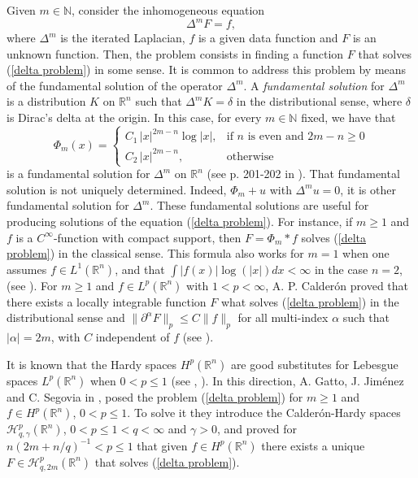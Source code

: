 \documentclass[reqno,10pt]{article}
\theoremstyle{definition}
\numberwithin{equation}{section}
\numberwithin{theorem}{section}
\begin{document}
Given $m \in \mathbb{N}$, consider the inhomogeneous equation
\begin{equation} \label{delta problem}
\Delta^m F = f,
\end{equation}
where $\Delta^m$ is the iterated Laplacian, $f$ is a given data function and $F$ is an unknown function. Then, the problem consists in 
finding a function $F$ that solves (\ref{delta problem}) in some sense. It is common to address this problem by means of the fundamental solution of the operator $\Delta^m$. A \textit{fundamental solution} for $\Delta^m$ is a distribution $K$ on $\mathbb{R}^n$ such that 
$\Delta^m K = \delta$ in the distributional sense, where $\delta$ is Dirac's delta at the origin. In this case, for every $m \in \mathbb{N}$ fixed, we have that 
\[
\Phi_m(x) = \left\{ \begin{array}{cc}
                 C_1 \, |x|^{2m-n} \log{|x|}, & \text{if} \,\, n \,\, \text{is even and} \,\, 2m-n \geq 0  \\
                 C_2 \, |x|^{2m-n}, & \text{otherwise}
               \end{array} \right.
\]
is a fundamental solution for $\Delta^m$ on $\mathbb{R}^n$ (see p. 201-202 in \cite{Gelfand}). That fundamental solution is not uniquely determined. Indeed, $\Phi_m + u$ with $\Delta^m u = 0$, it is other fundamental solution for $\Delta^m$. These fundamental solutions are useful for producing solutions of the equation (\ref{delta problem}). For instance, if $m \geq 1$ and $f$ is a $C^{\infty}$-function with compact support, then $F= \Phi_m \ast f$ solves (\ref{delta problem}) in the classical sense. This formula also works for $m = 1$ when one assumes $f \in L^1(\mathbb{R}^n)$, and that $\int |f(x)| \log(|x|) dx < \infty$ in the case $n=2$, (see \cite[Theorem 2.21]{Gerald}). For $m \geq 1$ and $f \in L^p(\mathbb{R}^n)$ with $1 < p < \infty$, A. P. Calder\'on proved that there exists a locally integrable function $F$ what solves (\ref{delta problem}) in the distributional sense and $\| \partial^{\alpha} F \|_p \leq C \|f\|_p$ for all multi-index $\alpha$ such that $|\alpha| = 2m$, with $C$ independent of $f$ (see \cite[Lemma 8]{calderon}). 

It is known that the Hardy spaces $H^p(\mathbb{R}^n)$ are good substitutes for Lebesgue spaces 
$L^p(\mathbb{R}^n)$ when $0 < p \leq 1$ (see \cite{fefferman}, \cite{Elias}). In this direction, A. Gatto, J. Jim\'enez and C. Segovia in \cite{segovia}, posed the problem (\ref{delta problem}) for $m \geq 1$ and $f \in H^p(\mathbb{R}^n)$, $0 < p \leq 1$. To solve it they introduce the Calder\'on-Hardy spaces $\mathcal{H}^p_{q, \gamma}(\mathbb{R}^n)$, $0 < p \leq 1 < q < \infty$ and $\gamma > 0$, and proved for 
$n(2m + n/q)^{-1} < p \leq 1$ that given $f \in H^p(\mathbb{R}^n)$ there exists a unique $F \in \mathcal{H}^p_{q, 2m}(\mathbb{R}^n)$ that solves (\ref{delta problem}).
\end{document}
